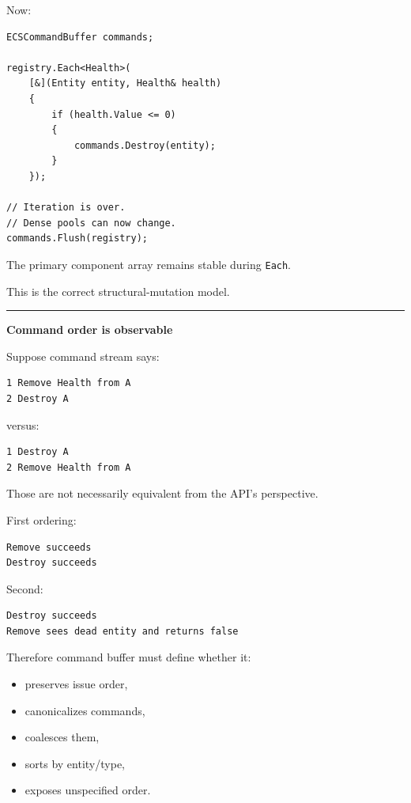 Now:

\begin{verbatim}
ECSCommandBuffer commands;

registry.Each<Health>(
    [&](Entity entity, Health& health)
    {
        if (health.Value <= 0)
        {
            commands.Destroy(entity);
        }
    });

// Iteration is over.
// Dense pools can now change.
commands.Flush(registry);
\end{verbatim}

The primary component array remains stable during \texttt{Each}.

This is the correct structural-mutation model.

\begin{center}\rule{0.5\linewidth}{0.5pt}\end{center}

\textbf{Command order is observable}

Suppose command stream says:

\begin{verbatim}
1 Remove Health from A
2 Destroy A
\end{verbatim}

versus:

\begin{verbatim}
1 Destroy A
2 Remove Health from A
\end{verbatim}

Those are not necessarily equivalent from the API's perspective.

First ordering:

\begin{verbatim}
Remove succeeds
Destroy succeeds
\end{verbatim}

Second:

\begin{verbatim}
Destroy succeeds
Remove sees dead entity and returns false
\end{verbatim}

Therefore command buffer must define whether it:

\begin{itemize}
\tightlist
\item
  preserves issue order,
\item
  canonicalizes commands,
\item
  coalesces them,
\item
  sorts by entity/type,
\item
  exposes unspecified order.
\end{itemize}

